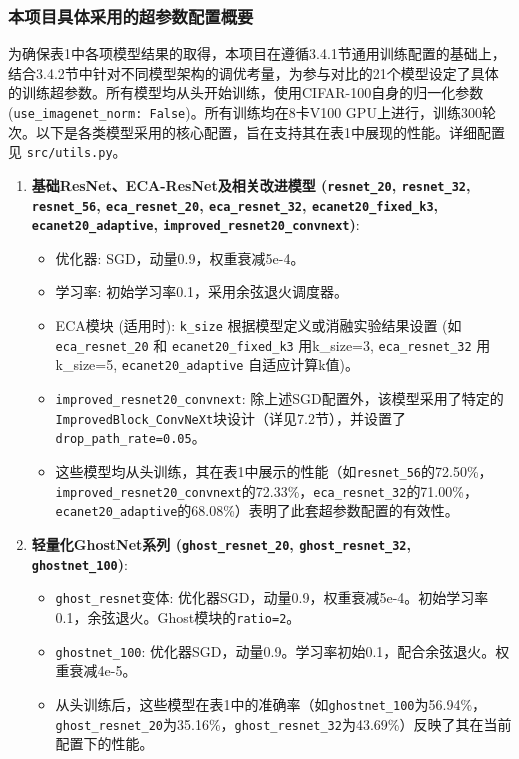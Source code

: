 \documentclass[a4paper]{article}
\begin{document}
\subsubsection{本项目具体采用的超参数配置概要}
为确保表1中各项模型结果的取得，本项目在遵循3.4.1节通用训练配置的基础上，结合3.4.2节中针对不同模型架构的调优考量，为参与对比的21个模型设定了具体的训练超参数。所有模型均从头开始训练，使用CIFAR-100自身的归一化参数 (\texttt{use\_imagenet\_norm: False})。所有训练均在8卡V100 GPU上进行，训练300轮次。以下是各类模型采用的核心配置，旨在支持其在表1中展现的性能。详细配置见 \texttt{src/utils.py}。
\begin{enumerate}
    \item \textbf{基础ResNet、ECA-ResNet及相关改进模型 (\texttt{resnet\_20}, \texttt{resnet\_32}, \texttt{resnet\_56}, \texttt{eca\_resnet\_20}, \texttt{eca\_resnet\_32}, \texttt{ecanet20\_fixed\_k3}, \texttt{ecanet20\_adaptive}, \texttt{improved\_resnet20\_convnext})}:
    \begin{itemize}
        \item 优化器: SGD，动量0.9，权重衰减5e-4。
        \item 学习率: 初始学习率0.1，采用余弦退火调度器。
        \item ECA模块 (适用时): \texttt{k\_size} 根据模型定义或消融实验结果设置 (如 \texttt{eca\_resnet\_20} 和 \texttt{ecanet20\_fixed\_k3} 用k\_size=3, \texttt{eca\_resnet\_32} 用k\_size=5, \texttt{ecanet20\_adaptive} 自适应计算k值)。
        \item \texttt{improved\_resnet20\_convnext}: 除上述SGD配置外，该模型采用了特定的\texttt{ImprovedBlock\_ConvNeXt}块设计（详见7.2节），并设置了\texttt{drop\_path\_rate=0.05}。
        \item 这些模型均从头训练，其在表1中展示的性能（如\texttt{resnet\_56}的72.50\%，\texttt{improved\_resnet20\_convnext}的72.33\%，\texttt{eca\_resnet\_32}的71.00\%，\texttt{ecanet20\_adaptive}的68.08\%）表明了此套超参数配置的有效性。
    \end{itemize}
    
    \item \textbf{轻量化GhostNet系列 (\texttt{ghost\_resnet\_20}, \texttt{ghost\_resnet\_32}, \texttt{ghostnet\_100})}:
    \begin{itemize}
        \item \texttt{ghost\_resnet}变体: 优化器SGD，动量0.9，权重衰减5e-4。初始学习率0.1，余弦退火。Ghost模块的\texttt{ratio=2}。
        \item \texttt{ghostnet\_100}: 优化器SGD，动量0.9。学习率初始0.1，配合余弦退火。权重衰减4e-5。
        \item 从头训练后，这些模型在表1中的准确率（如\texttt{ghostnet\_100}为56.94\%，\texttt{ghost\_resnet\_20}为35.16\%，\texttt{ghost\_resnet\_32}为43.69\%）反映了其在当前配置下的性能。
    \end{itemize}
    

\end{enumerate}
\end{document}
